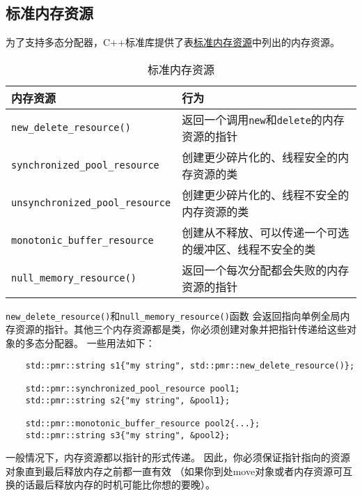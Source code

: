 \subsection{标准内存资源}
为了支持多态分配器，C++标准库提供了表\hyperref[t29.1]{标准内存资源}中列出的内存资源。
\begin{table}[ht]
    \centering
    \begin{tabular}{l|l}
        \hline
        \textbf{内存资源}                           & \textbf{行为}                                \\
        \hline
        \texttt{new\_delete\_resource()}        & 返回一个调用\texttt{new}和\texttt{delete}的内存资源的指针 \\
        \texttt{synchronized\_pool\_resource}   & 创建更少碎片化的、线程安全的内存资源的类                       \\
        \texttt{unsynchronized\_pool\_resource} & 创建更少碎片化的、线程不安全的内存资源的类                      \\
        \texttt{monotonic\_buffer\_resource}    & 创建从不释放、可以传递一个可选的缓冲区、线程不安全的类                \\
        \texttt{null\_memory\_resource()}       & 返回一个每次分配都会失败的内存资源的指针                       \\
        \hline
    \end{tabular}
    \caption{标准内存资源}
    \label{t29.1}
\end{table}

\texttt{new\_delete\_resource()}和\texttt{null\_memory\_resource()}函数
会返回指向单例全局内存资源的指针。其他三个内存资源都是类，你必须创建对象并把指针传递给这些对象的多态分配器。
一些用法如下：
\begin{lstlisting}
    std::pmr::string s1{"my string", std::pmr::new_delete_resource()};

    std::pmr::synchronized_pool_resource pool1;
    std::pmr::string s2{"my string", &pool1};

    std::pmr::monotonic_buffer_resource pool2{...};
    std::pmr::string s3{"my string", &pool2};
\end{lstlisting}
一般情况下，内存资源都以指针的形式传递。
因此，你必须保证指针指向的资源对象直到最后释放内存之前都一直有效
（如果你到处move对象或者内存资源可互换的话最后释放内存的时机可能比你想的要晚）。


